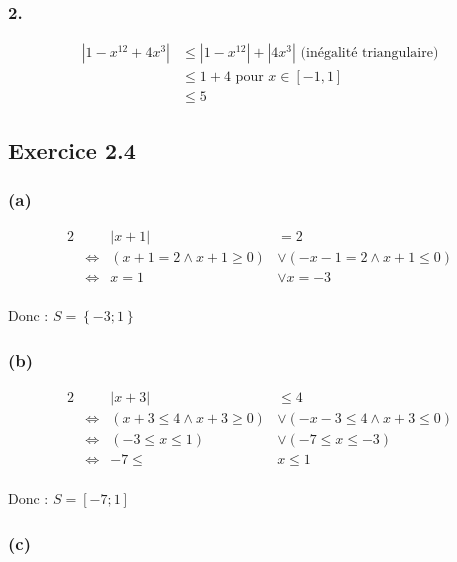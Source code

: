 \documentclass{report}
\begin{document}
\subsubsection*{2.}

\begin{equation*}
	\begin{split}
		|1-x^{12} +4x^3| &\leq |1- x^{12}|+ |4x^3| \text{ (inégalité triangulaire)} \\
		&\leq 1 + 4 \text{ pour $x \in [-1, 1]$}\\
		& \leq 5
	\end{split}
\end{equation*}


\subsection*{Exercice 2.4}

\subsubsection*{(a)}

\begin{alignat*}{2}
&                    & |x+1| &=2 \\
&\Longleftrightarrow &(x+1=2 \wedge x+1 \geq 0) &\vee (-x-1=2 \wedge x+1 \leq 0) \\
&\Longleftrightarrow & x=1 &\vee x=-3 \\
\end{alignat*}

Donc : $S=\left\lbrace -3 ; 1 \right\rbrace$

\subsubsection*{(b)}

\begin{alignat*}{2}
	&                    & |x+3| &\leq 4 \\
	&\Longleftrightarrow &(x+3\leq 4 \wedge x+3 \geq 0) &\vee (-x-3\leq 4 \wedge x+3 \leq 0) \\
	&\Longleftrightarrow & (-3 \leq x \leq 1) &\vee (-7 \leq x \leq -3) \\
	&\Longleftrightarrow & -7 \leq &x \leq 1 \\
\end{alignat*}

Donc : $S=[-7 ; 1]$

\subsubsection*{(c)}
\end{document}
